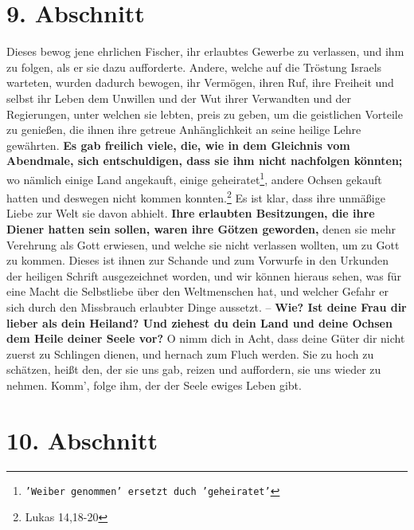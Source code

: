 \section{9. Abschnitt} \label{kap4_ab9}

\label{ref:04_09_besitz}
Dieses bewog jene ehrlichen Fischer, ihr erlaubtes Gewerbe zu verlassen, und ihm
zu folgen, als er sie dazu aufforderte. Andere, welche auf die Tröstung Israels
warteten, wurden dadurch bewogen, ihr Vermögen, ihren Ruf, ihre Freiheit und
selbst ihr Leben dem Unwillen und der Wut ihrer Verwandten und der
Regierungen, unter welchen sie lebten, preis zu geben, um die geistlichen
Vorteile zu genießen, die ihnen ihre getreue Anhänglichkeit an seine heilige
Lehre gewährten. \textbf{Es gab freilich viele, die, wie in dem Gleichnis vom
Abendmale, sich entschuldigen, dass sie ihm nicht nachfolgen könnten;} wo
nämlich
einige Land angekauft, einige geheiratet\footnote{\texttt{'Weiber genommen'
ersetzt
duch 'geheiratet'}}, andere Ochsen gekauft hatten und
deswegen nicht kommen konnten.\footnote{Lukas  14,18-20}
Es ist klar, dass ihre
unmäßige Liebe zur Welt sie davon abhielt. \textbf{Ihre erlaubten Besitzungen,
die ihre
Diener hatten sein sollen, waren ihre Götzen  geworden,} denen sie
mehr Verehrung
als Gott erwiesen, und welche sie nicht verlassen wollten, um zu Gott zu kommen.
Dieses ist ihnen zur Schande und zum Vorwurfe in den Urkunden der heiligen
Schrift ausgezeichnet worden, und wir können hieraus sehen, was für eine Macht
die Selbstliebe über den Weltmenschen hat, und welcher Gefahr er sich durch den
Missbrauch erlaubter Dinge aussetzt. -- \textbf{Wie? Ist deine Frau dir lieber
als dein
Heiland? Und ziehest du dein Land und deine Ochsen dem Heile deiner Seele vor?}
O
nimm dich in Acht, dass deine Güter dir nicht zuerst zu Schlingen dienen, und
hernach zum Fluch werden. Sie zu hoch zu schätzen, heißt den, der sie uns gab,
reizen und auffordern, sie uns wieder zu nehmen. Komm', folge ihm, der der Seele
ewiges Leben gibt.

\section{10. Abschnitt} \label{kap4_ab10}

